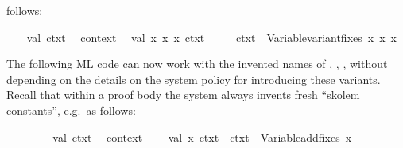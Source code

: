 \begin{isabellebody}
\begin{isamarkuptext}
  follows:%
\end{isamarkuptext}%
\isamarkuptrue%
%
\isadelimML
%
\endisadelimML
%
\isatagML
{}\isamarkupfalse%
\ {}\isanewline
\ \ val\ ctxt{}\ {}\ %
\isaantiq
context{}%
\endisaantiq
{}\isanewline
\ \ val\ {}{}x{}{}\ x{}{}\ x{}{}{}\ ctxt{}{}\ {}\isanewline
\ \ \ \ ctxt{}\ {}{}\ Variable{}variant{}fixes\ {}{}x{}{}\ {}x{}{}\ {}x{}{}{}\isanewline
{}%
\endisatagML
{\isafoldML}%
%
\isadelimML
%
\endisadelimML
%
\begin{isamarkuptext}%
The following ML code can now work with the invented names of
  , , , without depending on
  the details on the system policy for introducing these variants.
  Recall that within a proof body the system always invents fresh
  ``skolem constants'', e.g.\ as follows:%
\end{isamarkuptext}%
\isamarkuptrue%
\isamarkupfalse%
\isanewline
%
\isadelimML
\ \ %
\endisadelimML
%
\isatagML
{}\isamarkupfalse%
\ {}\isanewline
\ \ \ \ val\ ctxt{}\ {}\ %
\isaantiq
context{}%
\endisaantiq
{}\isanewline
\isanewline
\ \ \ \ val\ {}{}x{}{}{}\ ctxt{}{}\ {}\ ctxt{}\ {}{}\ Variable{}add{}fixes\ {}{}x{}{}{}\isanewline

\end{isabellebody}
